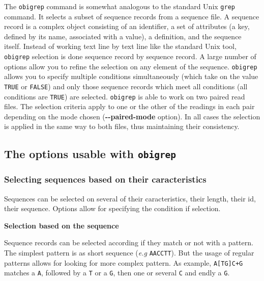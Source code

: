 \documentclass[
  letterpaper,
  DIV=11,
  numbers=noendperiod]{scrreprt}
\begin{document}
The \texttt{obigrep} command is somewhat analogous to the standard Unix
\texttt{grep} command. It selects a subset of sequence records from a
sequence file. A sequence record is a complex object consisting of an
identifier, a set of attributes (a key, defined by its name, associated
with a value), a definition, and the sequence itself. Instead of working
text line by text line like the standard Unix tool, \texttt{obigrep}
selection is done sequence record by sequence record. A large number of
options allow you to refine the selection on any element of the
sequence. \texttt{obigrep} allows you to specify multiple conditions
simultaneously (which take on the value \texttt{TRUE} or \texttt{FALSE})
and only those sequence records which meet all conditions (all
conditions are \texttt{TRUE}) are selected. \texttt{obigrep} is able to
work on two paired read files. The selection criteria apply to one or
the other of the readings in each pair depending on the mode chosen
(\textbf{-\/-paired-mode} option). In all cases the selection is applied
in the same way to both files, thus maintaining their consistency.

\hypertarget{the-options-usable-with-obigrep}{%
\subsection{\texorpdfstring{The options usable with
\texttt{obigrep}}{The options usable with obigrep}}\label{the-options-usable-with-obigrep}}

\hypertarget{selecting-sequences-based-on-their-caracteristics}{%
\subsubsection{Selecting sequences based on their
caracteristics}\label{selecting-sequences-based-on-their-caracteristics}}

Sequences can be selected on several of their caracteristics, their
length, their id, their sequence. Options allow for specifying the
condition if selection.

\textbf{Selection based on the sequence}

Sequence records can be selected according if they match or not with a
pattern. The simplest pattern is as short sequence (\emph{e.g}
\texttt{AACCTT}). But the usage of regular patterns allows for looking
for more complex pattern. As example, \texttt{A{[}TG{]}C+G} matches a
\texttt{A}, followed by a \texttt{T} or a \texttt{G}, then one or
several \texttt{C} and endly a \texttt{G}.
\end{document}
